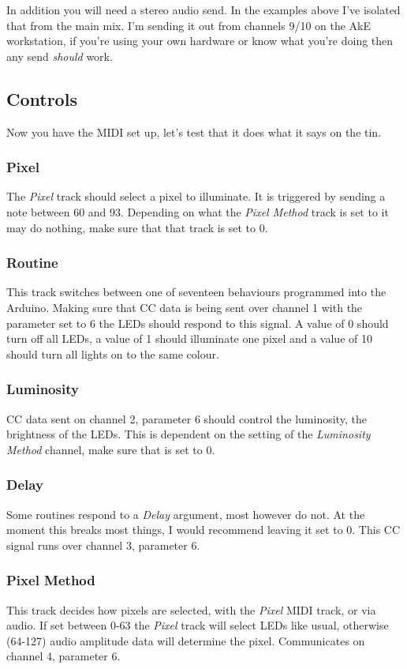 \documentclass{article}
\begin{document}
	In addition you will need a stereo audio send. In the examples above I've 
	isolated that from the main mix. I'm sending it out from channels 9/10 on 
	the AkE workstation, if you're using your own hardware or know what you're 
	doing then any send \emph{should} work.

	\subsection{Controls}
	Now you have the MIDI set up, let's test that it does what it says on the 
	tin.

	\subsubsection{Pixel}
	The \emph{Pixel} track should select a pixel to illuminate. It is triggered 
	by sending a note between 60 and 93. Depending on what the 
	\emph{Pixel Method} track is set to it may do nothing, make sure that that 
	track is set to 0.

	\subsubsection{Routine}
	This track switches between one of seventeen behaviours programmed into the 
	Arduino. Making sure that CC data is being sent over channel 1 with the 
	parameter set to 6 the LEDs should respond to this signal. A value of 0 
	should turn off all LEDs, a value of 1 should illuminate one pixel and a 
	value of 10 should turn all lights on to the same colour.

	\subsubsection{Luminosity}
	CC data sent on channel 2, parameter 6 should control the luminosity, the 
	brightness of the LEDs. This is dependent on the setting of the 
	\emph{Luminosity Method} channel, make sure that is set to 0.

	\subsubsection{Delay}
	Some routines respond to a \emph{Delay} argument, most however do not. At 
	the moment this breaks most things, I would recommend leaving it set to 0. 
	This CC signal runs over channel 3, parameter 6.

	\subsubsection{Pixel Method}
	This track decides how pixels are selected, with the \emph{Pixel} MIDI 
	track, or via audio. If set between 0-63 the \emph{Pixel} track will select 
	LEDs like usual, otherwise (64-127) audio amplitude data will determine 
	the pixel. Communicates on channel 4, parameter 6.
\end{document}
